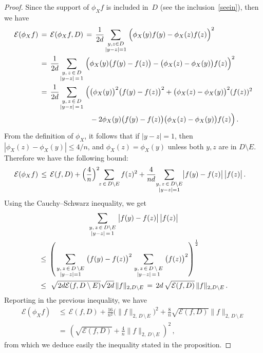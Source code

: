 \documentclass[10pt]{amsart}
\theoremstyle{definition}\newtheorem{defi}[theo]{Definition}\newtheorem{rema}[theo]{Remark}\newtheorem{exam}[theo]{Example}\newtheorem{exem}[theo]{Example}\newtheorem{nota}[theo]{Notation}
\newcommand{\tatop}[2]{\genfrac{}{}{0pt}{1}{#1}{#2}}
\newcommand{\cE}{\mathcal{E}}
\begin{document}
\begin{proof}
Since the support of $\phi_Xf$ is included in~$D$ (see the inclusion~\eqref{seein}), then we have
\begin{align*}
\cE(\phi_Xf)\,&=\,
\cE(\phi_Xf,D)
\,=\,
\frac{1}{2d}
\!
\sum_{\tatop{y,z\in D}{|y-z|=1}}
\Big(\phi_X(y)f(y)-\phi_X(z)f(z)\Big)^2\\
\,&=\,
\frac{1}{2d}
\!
\sum_{\tatop{y,\,z\,\in\,D}{|y-z|\,=\,1}}
\Big(\phi_X(y)\big(f(y)-f(z)\big)-\big(\phi_X(z)-\phi_X(y)\big)f(z)\Big)^2\\
\,&=\,
\frac{1}{2d}
\!
\sum_{\tatop{y,\,z\,\in\,D}{|y-z|\,=\,1}}
\Big(
\big(\phi_X(y)\big)^2\big(f(y)-f(z)\big)^2+
\big(\phi_X(z)-\phi_X(y)\big)^2(f(z))^2\\ &\kern70pt -2
\phi_X(y)\big(f(y)-f(z)\big)\big(\phi_X(z)-\phi_X(y)\big)f(z)\Big)\,.
\end{align*}
From the definition of $\phi_X$, it follows that if $|y-z|=1$, then $|\phi_X(z)-\phi_X(y)|\leq 4/n$, and $\phi_X(z)=\phi_X(y)$ unless both $y,z$ are in $D\setminus E$. Therefore we have the following bound:
\begin{align*}
\cE(\phi_Xf)
\,&\leq\,\cE(f,D)+\Big(\frac{4}{n}\Big)^2
\kern -3pt
\sum_{z\,\in\,D\setminus E} f(z)^2 +\frac{4}{nd}\kern -3pt
\sum_{\tatop{y,\,z\,\in\,D\setminus E}{|y-z|=1}}
\kern -3pt
\big| f(y)-f(z)\big|\,\big|f(z)\big|\,.
\end{align*}
Using the Cauchy--Schwarz inequality, we get
\begin{multline*}
\sum_{\tatop{y,\,z\,\in\,D\setminus E}{|y-z|\,=\,1}}
\big| f(y)-f(z)\big|\,\big|f(z)\big|\\
\begin{aligned}
&\leq\,\left(\sum_{\tatop{y,\,z\,\in\,D\,\setminus E}{|y-z|=1}}
\big(f(y)-f(z)\big)^2
\sum_{\tatop{y,\,z\,\in\,D\,\setminus\,E}{|y-z|\,=\,1}}
\big(f(z)\big)^2\right)^{\frac{1}{2}}\\
&\leq\,\,\sqrt{2d \cE(f,D\setminus E)}
\sqrt{2d}\, \|f\|_{2,D\setminus E}
\,=\,{2d}\,\sqrt{\cE(f,D)}\, \|f\|_{2,D\setminus E}\,.
\end{aligned}
\end{multline*}
Reporting in the previous inequality, we have
\begin{align*}
\cE(\phi_Xf)
\,&\leq\,\cE(f,D)+
\frac{16}{n^2}
\big(\|f\|_{2,\,D\,\setminus\,E}\big)^2 +\frac{8}{n}
\sqrt{\cE(f,D)} \|f\|_{2,\,D\,\setminus\,E}\\
\,&=\,
\left(
\sqrt{\cE(f,D)}+
\frac{4}{n} \|f\|_{2,\,D\,\setminus\,E}\right)^2\,,
\end{align*}
from which we deduce easily the inequality stated in the proposition.
\end{proof}
\end{document}
